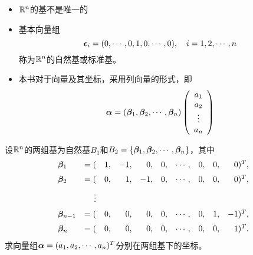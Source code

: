 \begin{zhu}
  \begin{itemize}
  \item $\mathbb R^n$的基不是唯一的
  \item 基本向量组
    $$
    \boldsymbol{\epsilon}_i=(0,\cdots,0,1,0,\cdots,0), \quad i=1,2,\cdots,n
    $$
    称为$\mathbb R^n$的自然基或标准基。
  \item 本书对于向量及其坐标，采用列向量的形式，即
    $$
    \boldsymbol{\alpha}=(\boldsymbol{\beta}_1,\boldsymbol{\beta}_2,\cdots,\boldsymbol{\beta}_n)\left(
      \begin{array}{c}
        a_1\\
        a_2\\
        \vdots\\
        a_n
      \end{array}
    \right)
    $$
  \end{itemize}
\end{zhu}

\begin{li}
  设$\mathbb R^n$的两组基为自然基$B_1$和$B_2=\{\boldsymbol{\beta}_1,\boldsymbol{\beta}_2,\cdots,\boldsymbol{\beta}_n\}$，其中
  \begin{equation}\label{twobase}
    \begin{array}{lrrrrrrrrr}
      \boldsymbol{\beta}_1&=(&1,&-1,& 0,&0,&\cdots,&0,&0,&0)^T,\\[0.2cm]
      \boldsymbol{\beta}_2&=(&0,& 1,&-1,&0,&\cdots,&0,&0,&0)^T,\\[0.2cm]
               &\vdots&&&&&\\[0.2cm]
      \boldsymbol{\beta}_{n-1}&=(&0,&0,&0,&0,&\cdots,&0,&1,&-1)^T,\\[0.2cm]
      \boldsymbol{\beta}_{n}&=(&0,&0,&0,&0,&\cdots,&0,&0,&1)^T.
    \end{array}
  \end{equation}
  求向量组$\boldsymbol{\alpha}=(a_1,a_2,\cdots,a_n)^T$分别在两组基下的坐标。
\end{li}

